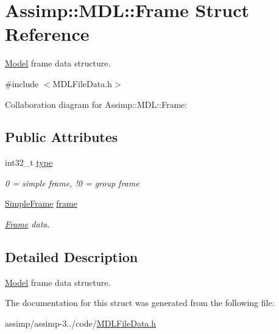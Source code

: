 \hypertarget{struct_assimp_1_1_m_d_l_1_1_frame}{\section{Assimp\+:\+:M\+D\+L\+:\+:Frame Struct Reference}
\label{struct_assimp_1_1_m_d_l_1_1_frame}
}


\hyperlink{class_model}{Model} frame data structure.  




{\ttfamily \#include $<$M\+D\+L\+File\+Data.\+h$>$}



Collaboration diagram for Assimp\+:\+:M\+D\+L\+:\+:Frame\+:
\subsection*{Public Attributes}
\begin{DoxyCompactItemize}
\item 
\hypertarget{struct_assimp_1_1_m_d_l_1_1_frame_ac5854403a2b34ac374f34156bb0718bd}{int32\+\_\+t \hyperlink{struct_assimp_1_1_m_d_l_1_1_frame_ac5854403a2b34ac374f34156bb0718bd}{type}}\label{struct_assimp_1_1_m_d_l_1_1_frame_ac5854403a2b34ac374f34156bb0718bd}

\begin{DoxyCompactList}\small\item\em 0 = simple frame, !0 = group frame \end{DoxyCompactList}\item 
\hypertarget{struct_assimp_1_1_m_d_l_1_1_frame_a716fbedd53c12a3b7389b266057a6f7d}{\hyperlink{struct_assimp_1_1_m_d_l_1_1_simple_frame}{Simple\+Frame} \hyperlink{struct_assimp_1_1_m_d_l_1_1_frame_a716fbedd53c12a3b7389b266057a6f7d}{frame}}\label{struct_assimp_1_1_m_d_l_1_1_frame_a716fbedd53c12a3b7389b266057a6f7d}

\begin{DoxyCompactList}\small\item\em \hyperlink{struct_assimp_1_1_m_d_l_1_1_frame}{Frame} data. \end{DoxyCompactList}\end{DoxyCompactItemize}


\subsection{Detailed Description}
\hyperlink{class_model}{Model} frame data structure. 

The documentation for this struct was generated from the following file\+:\begin{DoxyCompactItemize}
\item 
assimp/assimp-\/3../code/\hyperlink{_m_d_l_file_data_8h}{M\+D\+L\+File\+Data.\+h}\end{DoxyCompactItemize}
